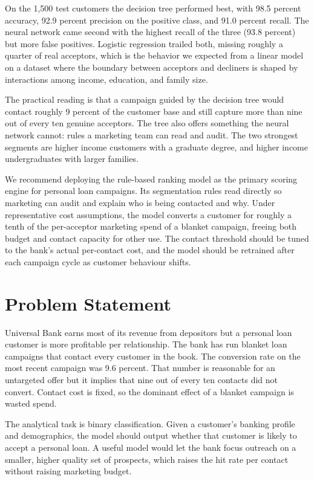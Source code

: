 \documentclass[11pt, a4paper]{article}
\begin{document}
On the 1{,}500 test customers the decision tree performed best, with 98.5
percent accuracy, 92.9 percent precision on the positive class, and 91.0
percent recall. The neural network came second with the highest recall of
the three (93.8 percent) but more false positives. Logistic regression
trailed both, missing roughly a quarter of real acceptors, which is the
behavior we expected from a linear model on a dataset where the boundary
between acceptors and decliners is shaped by interactions among income,
education, and family size.

The practical reading is that a campaign guided by the decision tree would
contact roughly 9 percent of the customer base and still capture more than
nine out of every ten genuine acceptors. The tree also offers something the
neural network cannot: rules a marketing team can read and audit. The two
strongest segments are higher income customers with a graduate degree, and
higher income undergraduates with larger families.

We recommend deploying the rule-based ranking model as the primary
scoring engine for personal loan campaigns. Its segmentation rules read
directly so marketing can audit and explain who is being contacted and
why. Under representative cost assumptions, the model converts a customer
for roughly a tenth of the per-acceptor marketing spend of a blanket
campaign, freeing both budget and contact capacity for other use. The
contact threshold should be tuned to the bank's actual per-contact cost,
and the model should be retrained after each campaign cycle as customer
behaviour shifts.

\newpage

\section{Problem Statement}

Universal Bank earns most of its revenue from depositors but a personal
loan customer is more profitable per relationship. The bank has run blanket
loan campaigns that contact every customer in the book. The conversion rate
on the most recent campaign was 9.6 percent. That number is reasonable for
an untargeted offer but it implies that nine out of every ten contacts did
not convert. Contact cost is fixed, so the dominant effect of a blanket
campaign is wasted spend.

The analytical task is binary classification. Given a customer's banking
profile and demographics, the model should output whether that customer is
likely to accept a personal loan. A useful model would let the bank focus
outreach on a smaller, higher quality set of prospects, which raises the
hit rate per contact without raising marketing budget.
\end{document}
